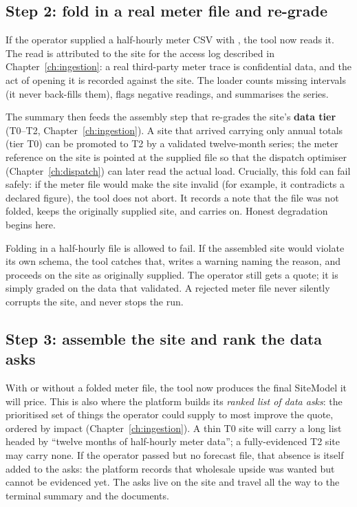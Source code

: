 \subsection{Step 2: fold in a real meter file and re-grade}

If the operator supplied a half-hourly meter CSV with , the tool now reads it. The read is attributed to the site for the access log described in Chapter~\ref{ch:ingestion}: a real third-party meter trace is confidential data, and the act of opening it is recorded against the site. The loader counts missing intervals (it never back-fills them), flags negative readings, and summarises the series.

The summary then feeds the assembly step that re-grades the site's \textbf{data tier} (T0--T2, Chapter~\ref{ch:ingestion}). A site that arrived carrying only annual totals (tier T0) can be promoted to T2 by a validated twelve-month series; the meter reference on the site is pointed at the supplied file so that the dispatch optimiser (Chapter~\ref{ch:dispatch}) can later read the actual load. Crucially, this fold can fail safely: if the meter file would make the site invalid (for example, it contradicts a declared figure), the tool does not abort. It records a note that the file was not folded, keeps the originally supplied site, and carries on. Honest degradation begins here.

\begin{caution}
Folding in a half-hourly file is allowed to fail. If the assembled site would violate its own schema, the tool catches that, writes a warning naming the reason, and proceeds on the site as originally supplied. The operator still gets a quote; it is simply graded on the data that validated. A rejected meter file never silently corrupts the site, and never stops the run.
\end{caution}

\subsection{Step 3: assemble the site and rank the data asks}

With or without a folded meter file, the tool now produces the final SiteModel it will price. This is also where the platform builds its \emph{ranked list of data asks}: the prioritised set of things the operator could supply to most improve the quote, ordered by impact (Chapter~\ref{ch:ingestion}). A thin T0 site will carry a long list headed by ``twelve months of half-hourly meter data''; a fully-evidenced T2 site may carry none. If the operator passed  but no forecast file, that absence is itself added to the asks: the platform records that wholesale upside was wanted but cannot be evidenced yet. The asks live on the site and travel all the way to the terminal summary and the documents.

